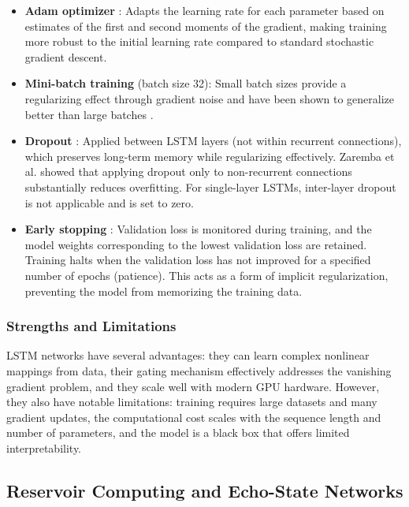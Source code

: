 \begin{itemize}
    \item \textbf{Adam optimizer} \cite{kingma2015adam}: Adapts the learning rate for each parameter based on estimates of the first and second moments of the gradient, making training more robust to the initial learning rate compared to standard stochastic gradient descent.

    \item \textbf{Mini-batch training} (batch size 32): Small batch sizes provide a regularizing effect through gradient noise and have been shown to generalize better than large batches \cite{masters2018revisiting}.

    \item \textbf{Dropout} \cite{zaremba2014recurrent}: Applied between LSTM layers (not within recurrent connections), which preserves long-term memory while regularizing effectively. Zaremba et al. showed that applying dropout only to non-recurrent connections substantially reduces overfitting. For single-layer LSTMs, inter-layer dropout is not applicable and is set to zero.

    \item \textbf{Early stopping} \cite{prechelt1998early}: Validation loss is monitored during training, and the model weights corresponding to the lowest validation loss are retained. Training halts when the validation loss has not improved for a specified number of epochs (patience). This acts as a form of implicit regularization, preventing the model from memorizing the training data.
\end{itemize}

\subsubsection{Strengths and Limitations}

LSTM networks have several advantages: they can learn complex nonlinear mappings from data, their gating mechanism effectively addresses the vanishing gradient problem, and they scale well with modern GPU hardware. However, they also have notable limitations: training requires large datasets and many gradient updates, the computational cost scales with the sequence length and number of parameters, and the model is a black box that offers limited interpretability.

\subsection{Reservoir Computing and Echo-State Networks}
\label{sec:esn}

